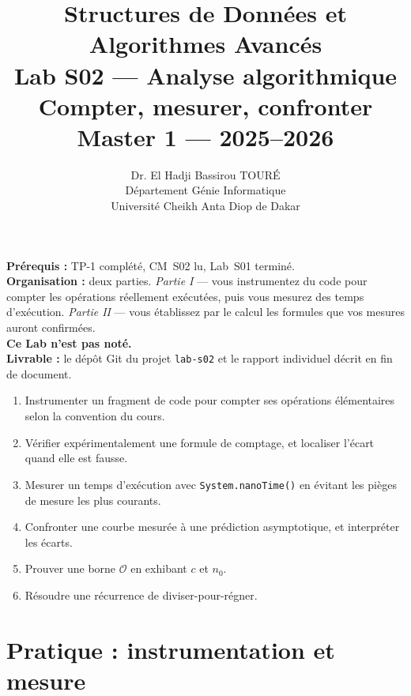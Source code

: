 \documentclass[11pt,a4paper]{article}
\title{%
\vspace{-1cm}
\textbf{\LARGE Structures de Données et}\\
\textbf{\LARGE Algorithmes Avancés}\\[0.8cm]
\textbf{\huge Lab S02 --- Analyse algorithmique}\\[0.3cm]
\textbf{\Large Compter, mesurer, confronter}\\[0.5cm]
\large Master 1 --- 2025--2026}
\author{Dr. El Hadji Bassirou TOURÉ\\
Département Génie Informatique\\
Université Cheikh Anta Diop de Dakar}
\date{}
\newcommand{\bigO}{\mathcal{O}}
\begin{document}
\maketitle
\thispagestyle{empty}

\begin{prereqbox}
\textbf{Prérequis :} TP-1 complété, CM~S02 lu, Lab~S01 terminé.\\[4pt]
\textbf{Organisation :} deux parties. \emph{Partie I} --- vous instrumentez
du code pour compter les opérations réellement exécutées, puis vous mesurez
des temps d'exécution. \emph{Partie II} --- vous établissez par le calcul
les formules que vos mesures auront confirmées.\\[4pt]
\textbf{Ce Lab n'est pas noté.}\\[4pt]
\textbf{Livrable :} le dépôt Git du projet \texttt{lab-s02} et le rapport
individuel décrit en fin de document.
\end{prereqbox}

\begin{objectifbox}
\begin{enumerate}[nosep]
    \item Instrumenter un fragment de code pour compter ses opérations
          élémentaires selon la convention du cours.
    \item Vérifier expérimentalement une formule de comptage, et localiser
          l'écart quand elle est fausse.
    \item Mesurer un temps d'exécution avec \texttt{System.nanoTime()} en
          évitant les pièges de mesure les plus courants.
    \item Confronter une courbe mesurée à une prédiction asymptotique, et
          interpréter les écarts.
    \item Prouver une borne $\bigO$ en exhibant $c$ et $n_0$.
    \item Résoudre une récurrence de diviser-pour-régner.
\end{enumerate}
\end{objectifbox}

\tableofcontents
\newpage

\part{Pratique : instrumentation et mesure}
\end{document}
